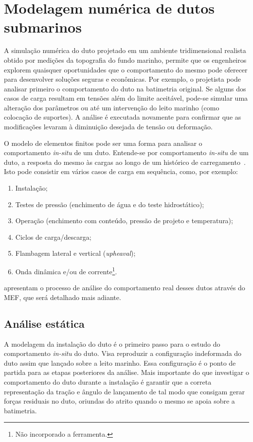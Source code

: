 \section{Modelagem numérica de dutos submarinos}\label{sec:assentamento}

A simulação numérica do duto projetado em um ambiente tridimensional realista obtido por medições da topografia do fundo marinho, permite que os engenheiros explorem quaisquer oportunidades que o comportamento do mesmo pode oferecer para desenvolver soluções seguras e econômicas. %
Por exemplo, o projetista pode analisar primeiro o comportamento do duto na batimetria original.
Se alguns dos casos de carga resultam em tensões além do limite aceitável, pode-se simular uma alteração dos parâmetros ou até um intervenção do leito marinho (como colocação de suportes).
A análise é executada novamente para confirmar que as modificações levaram à diminuição desejada de tensão ou deformação.

O modelo de elementos finitos pode ser uma forma para analisar o comportamento \textit{in-situ} de um duto.
Entende-se por comportamento \textit{in-situ} de um duto, a resposta do mesmo às cargas ao longo de um histórico de carregamento~\cite{Bai2014}. Isto pode consistir em vários casos de carga em sequência, como, por exemplo:

\begin{enumerate}
    \item Instalação;
    \item Testes de pressão (enchimento de água e do teste hidrostático);
    \item Operação (enchimento com conteúdo, pressão de projeto e temperatura);
    \item Ciclos de carga/descarga;
    \item Flambagem lateral e vertical (\textit{upheaval});
    \item Onda dinâmica e/ou de corrente\footnote{Não incorporado a ferramenta.}.
\end{enumerate}

 apresentam o processo de análise do comportamento real desses dutos através do MEF, que será detalhado mais adiante.


\subsection{Análise estática}


A modelagem da instalação do duto é o primeiro passo para o estudo do comportamento \textit{in-situ} do duto. Visa reproduzir a configuração indeformada do duto assim que lançado sobre a leito marinho.
Essa configuração é o ponto de partida para as etapas posteriores da análise.
Mais importante do que investigar o comportamento do duto durante a instalação é garantir que a correta representação da tração e ângulo de lançamento de tal modo que consigam gerar forças residuais no duto, oriundas do atrito quando o mesmo se apoia sobre a batimetria.

